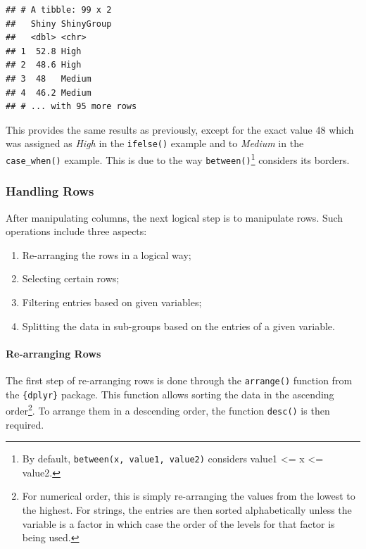 \documentclass[
]{krantz}
\providecommand{\tightlist}{%
  \setlength{\itemsep}{0pt}\setlength{\parskip}{0pt}}
\begin{document}
\begin{verbatim}
## # A tibble: 99 x 2
##   Shiny ShinyGroup
##   <dbl> <chr>     
## 1  52.8 High      
## 2  48.6 High      
## 3  48   Medium    
## 4  46.2 Medium    
## # ... with 95 more rows
\end{verbatim}

This provides the same results as previously, except for the exact value 48 which was assigned as \emph{High} in the \texttt{ifelse()} example and to \emph{Medium} in the \texttt{case\_when()} example. This is due to the way \texttt{between()}\footnote{By default, \texttt{between(x,\ value1,\ value2)} considers value1 \textless= x \textless= value2.} considers its borders.

\hypertarget{handling-rows}{%
\subsubsection*{Handling Rows}\label{handling-rows}}


After manipulating columns, the next logical step is to manipulate rows. Such operations include three aspects:

\begin{enumerate}
\def\labelenumi{\arabic{enumi}.}
\tightlist
\item
  Re-arranging the rows in a logical way;
\item
  Selecting certain rows;
\item
  Filtering entries based on given variables;
\item
  Splitting the data in sub-groups based on the entries of a given variable.
\end{enumerate}

\hypertarget{re-arranging-rows}{%
\paragraph*{Re-arranging Rows}\label{re-arranging-rows}}

The first step of re-arranging rows is done through the \texttt{arrange()} function from the \texttt{\{dplyr\}} package. This function allows sorting the data in the ascending order\footnote{For numerical order, this is simply re-arranging the values from the lowest to the highest. For strings, the entries are then sorted alphabetically unless the variable is a factor in which case the order of the levels for that factor is being used.}. To arrange them in a descending order, the function \texttt{desc()} is then required.
\end{document}
